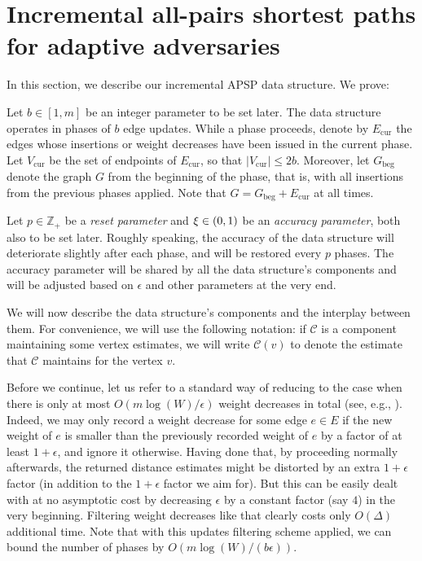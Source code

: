 \documentclass[11pt,letterpaper]{article}
\theoremstyle{plain}
\renewcommand{\O}{O}
\newcommand{\eps}{\ensuremath{\epsilon}}
\begin{document}
\section{Incremental all-pairs shortest paths for adaptive adversaries}\label{sec:all-pairs}
In this section, we describe our incremental APSP data structure. We prove:
\tallpairs*

\newcommand{\Vcur}{V_{\mathrm{cur}}}
\newcommand{\Ecur}{E_{\mathrm{cur}}}
\newcommand{\Gbeg}{G_{\mathrm{beg}}}
\newcommand{\batchds}{\mathcal{B}}
\newcommand{\dsfrom}{\mathcal{D}}
\newcommand{\dsto}{\mathcal{D}^{R}}
\newcommand{\apsp}{\mathcal{A}}
\newcommand{\Gto}{G^{\mathrm{to}}}
\newcommand{\Gfrom}{G^{\mathrm{from}}}
\newcommand{\phlen}{b}
\newcommand{\reset}{p}

Let $\phlen\in [1,m]$ be an integer parameter to be set later.
The data structure operates in phases of $\phlen$ edge updates.
While a phase proceeds, denote by $\Ecur$ the edges whose insertions or weight decreases have been issued in the current phase.
Let $\Vcur$ be the set of endpoints of $\Ecur$, so that $|\Vcur|\leq 2b$. Moreover, let $\Gbeg$ denote the graph $G$ from the beginning of
the phase, that is, with all insertions from the previous phases applied.
Note that $G=\Gbeg+\Ecur$ at all times.

Let $\reset\in \mathbb{Z}_+$ be a \emph{reset parameter} and $\xi\in (0,1)$ be an \emph{accuracy parameter},
both also to be set later.
Roughly speaking, the accuracy of the data structure will deteriorate slightly after each phase,
and will be restored every $\reset$ phases.
The accuracy parameter will be shared by all the data structure's components and will
be adjusted based on $\eps$ and other parameters at the very end.

We will now describe the data structure's components and the interplay between them.
For convenience, we will use the following notation: if $\mathcal{C}$ is a component maintaining
some vertex estimates, we will write $\mathcal{C}(v)$ to denote the estimate that $\mathcal{C}$ maintains for
the vertex $v$.

Before we continue, let us refer to a standard way of reducing to the case when there is only at most $\O(m\log(W)/\eps)$ weight decreases in total (see, e.g., \cite{Bernstein16}).
Indeed, we may only record a weight decrease for some edge $e\in E$ if the new weight of $e$ is smaller than the previously recorded weight of $e$ by a factor of at least $1+\eps$, and ignore it otherwise.
Having done that, by proceeding normally afterwards, the returned distance estimates might be distorted by an extra $1+\eps$ factor (in addition to the $1+\eps$ factor we aim for).
But this can be easily dealt with at no asymptotic cost by decreasing $\eps$ by a constant factor (say $4$) in the very beginning.
Filtering weight decreases like that clearly costs only $\O(\Delta)$ additional time.
Note that with this updates filtering scheme applied, we can bound the number of phases by $\O(m\log(W)/(\phlen\eps))$.
\end{document}
